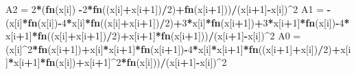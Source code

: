 \documentclass[
]{book}
\newenvironment{Shaded}{\begin{snugshade}}{\end{snugshade}}
\newcommand{\DecValTok}[1]{\textcolor[rgb]{0.00,0.00,0.81}{#1}}
\newcommand{\FunctionTok}[1]{\textcolor[rgb]{0.13,0.29,0.53}{\textbf{#1}}}
\newcommand{\NormalTok}[1]{#1}
\newcommand{\OtherTok}[1]{\textcolor[rgb]{0.56,0.35,0.01}{#1}}
\newcommand{\SpecialCharTok}[1]{\textcolor[rgb]{0.81,0.36,0.00}{\textbf{#1}}}
\begin{document}
\begin{Shaded}
\begin{Highlighting}[]
\NormalTok{    A2 }\OtherTok{=} \DecValTok{2}\SpecialCharTok{*}\NormalTok{(}\FunctionTok{fn}\NormalTok{(x[i]) }\SpecialCharTok{{-}}\DecValTok{2}\SpecialCharTok{*}\FunctionTok{fn}\NormalTok{((x[i]}\SpecialCharTok{+}\NormalTok{x[i}\SpecialCharTok{+}\DecValTok{1}\NormalTok{])}\SpecialCharTok{/}\DecValTok{2}\NormalTok{)}\SpecialCharTok{+}\FunctionTok{fn}\NormalTok{(x[i}\SpecialCharTok{+}\DecValTok{1}\NormalTok{]))}\SpecialCharTok{/}\NormalTok{(x[i}\SpecialCharTok{+}\DecValTok{1}\NormalTok{]}\SpecialCharTok{{-}}\NormalTok{x[i])}\SpecialCharTok{\^{}}\DecValTok{2}
\NormalTok{    A1 }\OtherTok{=} \SpecialCharTok{{-}}\NormalTok{(x[i]}\SpecialCharTok{*}\FunctionTok{fn}\NormalTok{(x[i])}\SpecialCharTok{{-}}\DecValTok{4}\SpecialCharTok{*}\NormalTok{x[i]}\SpecialCharTok{*}\FunctionTok{fn}\NormalTok{((x[i]}\SpecialCharTok{+}\NormalTok{x[i}\SpecialCharTok{+}\DecValTok{1}\NormalTok{])}\SpecialCharTok{/}\DecValTok{2}\NormalTok{)}\SpecialCharTok{+}\DecValTok{3}\SpecialCharTok{*}\NormalTok{x[i]}\SpecialCharTok{*}\FunctionTok{fn}\NormalTok{(x[i}\SpecialCharTok{+}\DecValTok{1}\NormalTok{])}\SpecialCharTok{+}\DecValTok{3}\SpecialCharTok{*}\NormalTok{x[i}\SpecialCharTok{+}\DecValTok{1}\NormalTok{]}\SpecialCharTok{*}\FunctionTok{fn}\NormalTok{(x[i])}\SpecialCharTok{{-}}\DecValTok{4}\SpecialCharTok{*}\NormalTok{x[i}\SpecialCharTok{+}\DecValTok{1}\NormalTok{]}\SpecialCharTok{*}\FunctionTok{fn}\NormalTok{((x[i]}\SpecialCharTok{+}\NormalTok{x[i}\SpecialCharTok{+}\DecValTok{1}\NormalTok{])}\SpecialCharTok{/}\DecValTok{2}\NormalTok{)}\SpecialCharTok{+}\NormalTok{x[i}\SpecialCharTok{+}\DecValTok{1}\NormalTok{]}\SpecialCharTok{*}\FunctionTok{fn}\NormalTok{(x[i}\SpecialCharTok{+}\DecValTok{1}\NormalTok{]))}\SpecialCharTok{/}\NormalTok{(x[i}\SpecialCharTok{+}\DecValTok{1}\NormalTok{]}\SpecialCharTok{{-}}\NormalTok{x[i])}\SpecialCharTok{\^{}}\DecValTok{2}
\NormalTok{    A0 }\OtherTok{=}\NormalTok{ (x[i]}\SpecialCharTok{\^{}}\DecValTok{2}\SpecialCharTok{*}\FunctionTok{fn}\NormalTok{(x[i}\SpecialCharTok{+}\DecValTok{1}\NormalTok{])}\SpecialCharTok{+}\NormalTok{x[i]}\SpecialCharTok{*}\NormalTok{x[i}\SpecialCharTok{+}\DecValTok{1}\NormalTok{]}\SpecialCharTok{*}\FunctionTok{fn}\NormalTok{(x[i}\SpecialCharTok{+}\DecValTok{1}\NormalTok{])}\SpecialCharTok{{-}}\DecValTok{4}\SpecialCharTok{*}\NormalTok{x[i]}\SpecialCharTok{*}\NormalTok{x[i}\SpecialCharTok{+}\DecValTok{1}\NormalTok{]}\SpecialCharTok{*}\FunctionTok{fn}\NormalTok{((x[i}\SpecialCharTok{+}\DecValTok{1}\NormalTok{]}\SpecialCharTok{+}\NormalTok{x[i])}\SpecialCharTok{/}\DecValTok{2}\NormalTok{)}\SpecialCharTok{+}\NormalTok{x[i]}\SpecialCharTok{*}\NormalTok{x[i}\SpecialCharTok{+}\DecValTok{1}\NormalTok{]}\SpecialCharTok{*}\FunctionTok{fn}\NormalTok{(x[i])}\SpecialCharTok{+}\NormalTok{x[i}\SpecialCharTok{+}\DecValTok{1}\NormalTok{]}\SpecialCharTok{\^{}}\DecValTok{2}\SpecialCharTok{*}\FunctionTok{fn}\NormalTok{(x[i]))}\SpecialCharTok{/}\NormalTok{(x[i}\SpecialCharTok{+}\DecValTok{1}\NormalTok{]}\SpecialCharTok{{-}}\NormalTok{x[i])}\SpecialCharTok{\^{}}\DecValTok{2}

\end{Highlighting}
\end{Shaded}
\end{document}

